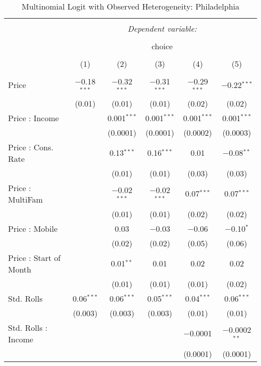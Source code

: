 
\begin{table}[!htbp] \centering 
  \caption{Multinomial Logit with Observed Heterogeneity: Philadelphia} 
  \label{tab:mnlPhiladelphiaObsHet} 
\begin{tabular}{@{\extracolsep{5pt}}lccccc} 
\\[-1.8ex]\hline 
\hline \\[-1.8ex] 
 & \multicolumn{5}{c}{\textit{Dependent variable:}} \\ 
\cline{2-6} 
\\[-1.8ex] & \multicolumn{5}{c}{choice} \\ 
\\[-1.8ex] & (1) & (2) & (3) & (4) & (5)\\ 
\hline \\[-1.8ex] 
 Price & $-$0.18$^{***}$ & $-$0.32$^{***}$ & $-$0.31$^{***}$ & $-$0.29$^{***}$ & $-$0.22$^{***}$ \\ 
  & (0.01) & (0.01) & (0.01) & (0.02) & (0.02) \\ 
  Price : Income &  & 0.001$^{***}$ & 0.001$^{***}$ & 0.001$^{***}$ & 0.001$^{***}$ \\ 
  &  & (0.0001) & (0.0001) & (0.0002) & (0.0003) \\ 
  Price : Cons. Rate &  & 0.13$^{***}$ & 0.16$^{***}$ & 0.01 & $-$0.08$^{**}$ \\ 
  &  & (0.01) & (0.01) & (0.03) & (0.03) \\ 
  Price : MultiFam &  & $-$0.02$^{***}$ & $-$0.02$^{***}$ & 0.07$^{***}$ & 0.07$^{***}$ \\ 
  &  & (0.01) & (0.01) & (0.02) & (0.02) \\ 
  Price : Mobile &  & 0.03 & $-$0.03 & $-$0.06 & $-$0.10$^{*}$ \\ 
  &  & (0.02) & (0.02) & (0.05) & (0.06) \\ 
  Price : Start of Month &  & 0.01$^{**}$ & 0.01 & 0.02 & 0.02 \\ 
  &  & (0.01) & (0.01) & (0.01) & (0.02) \\ 
  Std. Rolls & 0.06$^{***}$ & 0.06$^{***}$ & 0.05$^{***}$ & 0.04$^{***}$ & 0.06$^{***}$ \\ 
  & (0.003) & (0.003) & (0.003) & (0.01) & (0.01) \\ 
  Std. Rolls : Income &  &  &  & $-$0.0001 & $-$0.0002$^{**}$ \\ 
  &  &  &  & (0.0001) & (0.0001) \\ 

\end{tabular}
\end{table}

